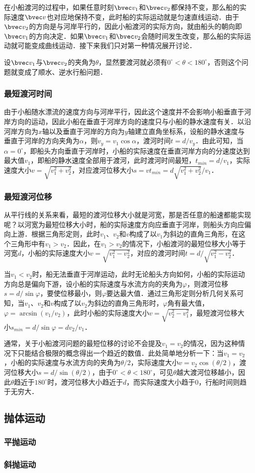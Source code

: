 在小船渡河的过程中，如果任意时刻$\bvec v_1$和$\bvec v_2$都保持不变，那么船的实际速度$\bvec v$也对应地保持不变，此时船的实际运动就是匀速直线运动．由于$\bvec v_2$的方向是与河岸平行的，因此小船渡河的实际方向，就由船头的朝向即$\bvec v_1$的方向决定．如果$\bvec v_1$和$\bvec v_2$会随时间发生改变，那么船的实际运动就可能变成曲线运动．接下来我们只对第一种情况展开讨论．

设$\bvec v_1$与$\bvec v_2$的夹角为$\theta$，显然要渡河就必须有$0^\circ < \theta < 180^\circ $，否则这个问题就变成了顺水、逆水行船问题．

\subsubsection{最短渡河时间}

由于小船随水漂流的速度方向与河岸平行，因此这个速度并不会影响小船垂直于河岸方向的运动，因此小船在垂直于河岸方向的速度只与小船的静水速度有关．以沿河岸方向为$x$轴以及垂直于河岸的方向为$y$轴建立直角坐标系，设船的静水速度与垂直于河岸的方向夹角为$\alpha$，则$v_y = v_1 \cos \alpha$，渡河时间$t=d/v_y$．由此可知，当$\alpha = 0^\circ$，即船头方向垂直于河岸时，小船的实际速度在垂直河岸方向的分速度达到最大值$v_1$，即船的静水速度全部用于渡河，此时渡河时间最短，$t_{min}=d/v_1$，实际速度大小$v=\sqrt{v_1^2+v_2^2}$，对应渡河位移大小$s=vt_{min}=d\sqrt{v_1^2+v_2^2}/v_1$．

\subsubsection{最短渡河位移}

从平行线的关系来看，最短的渡河位移大小就是河宽，那是否任意的船速都能实现呢？以河宽为最短位移大小时，船的实际速度方向应垂直于河岸，则船头方向应偏向上游．根据三角形定则，此时$v_1$、$v_2$和$v$构成了以$v_1$为斜边的直角三角形，在这个三角形中有$v_1>v_2$．因此，在$v_1>v_2$的情况下，小船渡河的最短位移大小等于河宽$d$，小船的实际速度大小$v=\sqrt{v_1^2-v_2^2}$，对应的渡河时间$t=d/\sqrt{v_1^2-v_2^2}$．

当$v_1<v_2$时，船无法垂直于河岸运动，此时无论船头方向如何，小船的实际运动方向总是偏向下游，设小船的实际速度与水流方向的夹角为$\varphi$，则渡河位移$s = d/\sin \varphi$，要使位移最小，则$\varphi$要达最大值．通过三角形定则分析几何关系可知，当$v_1$、$v_2$和$v$构成了以$v_2$为斜边的直角三角形时，$\varphi$角有最大值，$\varphi=\arcsin(v_1/v_2)$，此时小船的实际速度大小$v=\sqrt{v_2^2-v_1^2}$，最短渡河位移大小$s_{min} = d/\sin \varphi=dv_2/v_1$．

通常，关于小船渡河问题的最短位移的讨论不会提及$v_1=v_2$的情况，因为这种情况下只能结合极限的概念得出一个趋近的数值．此处简单地分析一下：当$v_1=v_2$，小船的实际速度与水流方向的夹角为$\theta /2$，实际速度大小$v= v_2\cos(\theta /2)$，渡河位移大小$s= d/\sin(\theta/2)$，由于$0^\circ < \theta < 180^\circ $，可见$\theta$越大渡河位移越小，因此$\theta$趋近于$180^\circ $时，渡河位移大小趋近于$d$，而实际速度大小趋于$0$，行船时间则趋于无穷大．

\subsection{抛体运动}

\subsubsection{平抛运动}

\subsubsection{斜抛运动}
